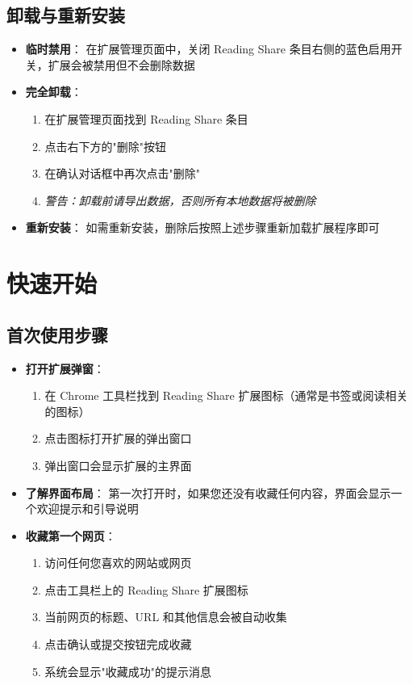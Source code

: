 \documentclass[10pt,a4paper]{article}
\newcommand{\stepitem}[2]{%
  \item \textbf{#1}：#2
}
\begin{document}
\subsection{卸载与重新安装}
\begin{itemize}
  \stepitem{临时禁用}{%
    在扩展管理页面中，关闭 Reading Share 条目右侧的蓝色启用开关，扩展会被禁用但不会删除数据
  }
  \stepitem{完全卸载}{%
    \begin{enumerate}
      \item 在扩展管理页面找到 Reading Share 条目
      \item 点击右下方的"删除"按钮
      \item 在确认对话框中再次点击"删除"
      \item \textit{警告：卸载前请导出数据，否则所有本地数据将被删除}
    \end{enumerate}
  }
  \stepitem{重新安装}{%
    如需重新安装，删除后按照上述步骤重新加载扩展程序即可
  }
\end{itemize}

\vspace{5pt}

\section{快速开始}

\subsection{首次使用步骤}
\begin{itemize}
  \stepitem{打开扩展弹窗}{%
    \begin{enumerate}
      \item 在 Chrome 工具栏找到 Reading Share 扩展图标（通常是书签或阅读相关的图标）
      \item 点击图标打开扩展的弹出窗口
      \item 弹出窗口会显示扩展的主界面
    \end{enumerate}
  }
  \stepitem{了解界面布局}{%
    第一次打开时，如果您还没有收藏任何内容，界面会显示一个欢迎提示和引导说明
  }
  \stepitem{收藏第一个网页}{%
    \begin{enumerate}
      \item 访问任何您喜欢的网站或网页
      \item 点击工具栏上的 Reading Share 扩展图标
      \item 当前网页的标题、URL 和其他信息会被自动收集
      \item 点击确认或提交按钮完成收藏
      \item 系统会显示"收藏成功"的提示消息
    \end{enumerate}
  }
\end{itemize}
\end{document}
